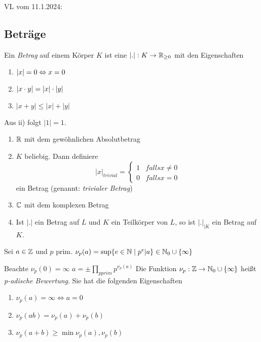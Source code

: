 \documentclass[../main.tex]{subfiles}
\begin{document}
\begin{flushright}
VL vom 11.1.2024:
\end{flushright}
\subsection{Beträge}
\begin{definition}
    Ein \emph{Betrag} auf einem Körper $K$ ist eine $\left\vert . \right\vert: K\rightarrow \mathbb{R}_{\geq0}$ mit den Eigenschaften
    \begin{enumerate}
        \item $\left\vert x \right\vert = 0 \Leftrightarrow x =0$
        \item $\left\vert x\cdot y \right\vert = |x| \cdot |y|$
        \item $|x+y| \leq |x| + |y|$
    \end{enumerate}
    Aus ii) folgt $|1| = 1$.
\end{definition}
\begin{example}
    \begin{enumerate}[label=\roman*)] %
        \item $\mathbb{R}$ mit dem gewöhnlichen Absolutbetrag
        \item $K$ beliebig. Dann definiere 
        $$|x|_{trivial} = \begin{cases}
            1 & falls x\neq 0\\
            0 & falls x= 0
        \end{cases}$$
        ein Betrag (genannt: \emph{trivialer Betrag})
        \item $\mathbb{C}$ mit dem komplexen Betrag
        \item Ist $|.|$ ein Betrag auf $L$ und $K$ ein Teilkörper von $L$, so ist $|.|_{|K}$ ein Betrag auf $K$.
    \end{enumerate}
\end{example}
\begin{definition} 
    Sei $a\in \mathbb{Z}$ und $p$ prim.
    $\nu_p(a)= \sup\{e\in \mathbb{N}\mid p^e|a\}\in \mathbb{N}_0\cup \{\infty\}$
\end{definition}
Beachte $\nu_p(0) = \infty$
$a = \pm \prod_{p prim} p^{\nu_p(a)}$
Die Funktion $\nu_p:\mathbb{Z}\rightarrow \mathbb{N}_0\cup \{\infty\}$ heißt \emph{p-adische Bewertung}. Sie hat die folgenden Eigenschaften
\begin{enumerate}[label=\roman*)]%
    \item $\nu_p(a) = \infty \Leftrightarrow a = 0$
    \item $\nu_p(ab) = \nu_p(a)+\nu_p(b)$
    \item $\nu_p(a+b) \geq \min{\nu_p(a),\nu_p(b)}$
\end{enumerate}
\end{document}
